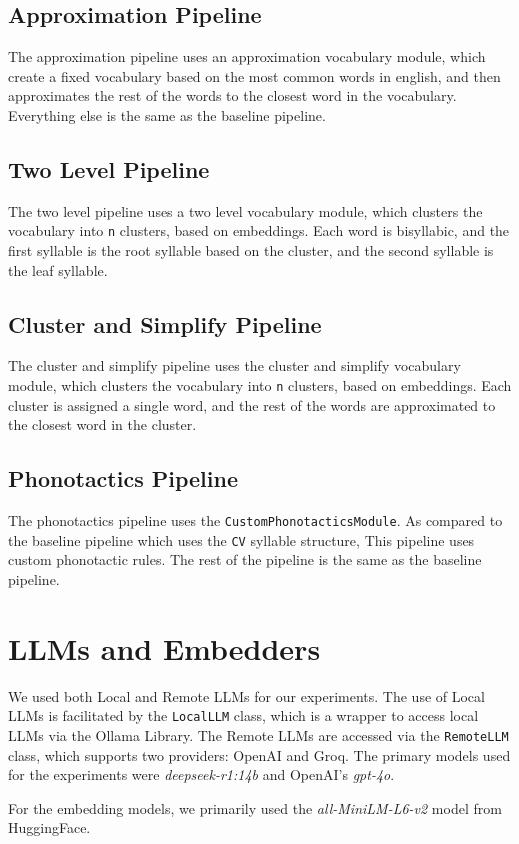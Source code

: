 \subsection{Approximation Pipeline}
The approximation pipeline uses an approximation vocabulary module, which create a fixed vocabulary based on the most common words in english, 
and then approximates the rest of the words to the closest word in the vocabulary. Everything else is the same as the baseline pipeline.
\subsection{Two Level Pipeline}
The two level pipeline uses a two level vocabulary module, which clusters the vocabulary into \texttt{n} clusters, based on embeddings. Each word is bisyllabic, 
and the first syllable is the root syllable based on the cluster, and the second syllable is the leaf syllable.
\subsection{Cluster and Simplify Pipeline}
The cluster and simplify pipeline uses the cluster and simplify vocabulary module, which clusters the vocabulary into \texttt{n} clusters, based on embeddings.
Each cluster is assigned a single word, and the rest of the words are approximated to the closest word in the cluster.
\subsection{Phonotactics Pipeline}
The phonotactics pipeline uses the \texttt{CustomPhonotacticsModule}. As compared to the baseline pipeline which uses the \texttt{CV} syllable structure,
This pipeline uses custom phonotactic rules. The rest of the pipeline is the same as the baseline pipeline.

\section{LLMs and Embedders}
We used both Local and Remote LLMs for our experiments. The use of Local LLMs is facilitated by the \texttt{LocalLLM} class, which is a wrapper 
to access local LLMs via the Ollama Library. The Remote LLMs are accessed via the \texttt{RemoteLLM} class, which supports two providers: OpenAI and Groq.
The primary models used for the experiments were \textit{deepseek-r1:14b} and OpenAI's \textit{gpt-4o}.  

For the embedding models, we primarily used the \textit{all-MiniLM-L6-v2} model from HuggingFace.

